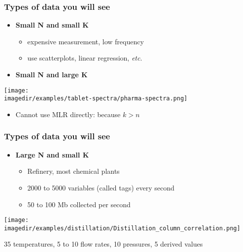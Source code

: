 \begin{frame}\frametitle{Types of data you will see}
	\begin{itemize}
		\item	\textbf{Small N and small K}
		\begin{itemize}
			\item	expensive measurement, low frequency
			\item	use scatterplots, linear regression, \emph{etc}.
		\end{itemize}
		\item	\textbf{Small N and large K}
	\end{itemize}

	\texttt{[image: \\imagedir/examples/tablet-spectra/pharma-spectra.png]}
	\begin{itemize}
		\item	Cannot use MLR directly: because $k > n$
	\end{itemize}
\end{frame}

\begin{frame}\frametitle{Types of data you will see}
	\begin{itemize}
		\item	\textbf{Large N and small K}
		\begin{itemize}
			\item	Refinery, most chemical plants
			\item	2000 to 5000 variables (called tags) every second
			\item	50 to 100 Mb collected per second
		\end{itemize}
	\end{itemize}

	\texttt{[image: \\imagedir/examples/distillation/Distillation\_column\_correlation.png]}

	35 temperatures, 5 to 10 flow rates, 10 pressures, 5 derived values
\end{frame}


